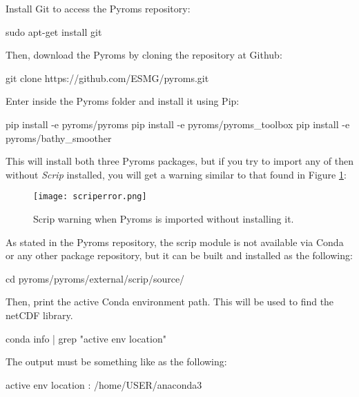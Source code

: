 Install Git to access the Pyroms repository:\label{gitinfo}
\bigskip

\begin{bashcode}
sudo apt-get install git
\end{bashcode}
\bigskip

Then, download the Pyroms by cloning the repository at Github:
\bigskip

\begin{bashcode}
git clone https://github.com/ESMG/pyroms.git
\end{bashcode}
\bigskip

Enter inside the Pyroms folder and install it using Pip:
\bigskip

\begin{bashcode}
pip install -e pyroms/pyroms
pip install -e pyroms/pyroms_toolbox
pip install -e pyroms/bathy_smoother
\end{bashcode}
\bigskip

This will install both three Pyroms packages, but if you try to import any of then without \textit{Scrip} installed, you will get a warning 
similar to that found in \textcolor{bleu_cite}{Figure \ref{scriperror}}:
\bigskip

\begin{figure}[H]
  \centering
  \texttt{[image: scriperror.png]}
  \caption{Scrip warning when Pyroms is imported without installing it.}
  \label{scriperror}
\end{figure}
\bigskip

As stated in the Pyroms repository, the scrip module is not available via Conda or any other package repository, but it can be built 
and installed as the following:
\bigskip

\begin{bashcode}
cd pyroms/pyroms/external/scrip/source/
\end{bashcode}
\bigskip

Then, print the active Conda environment path. This will be used to find the netCDF library.
\bigskip

\begin{bashcode}
conda info | grep "active env location"
\end{bashcode}
\bigskip

The output must be something like as the following:
\bigskip

\begin{bashcode}
active env location : /home/USER/anaconda3
\end{bashcode}
\bigskip

